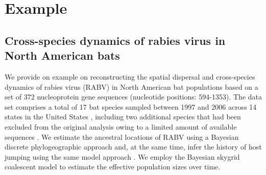 \documentclass{bioinfo}
\begin{document}
\section*{Example}

\subsection*{Cross-species dynamics of rabies virus in North American bats}

We provide on example on reconstructing the spatial dispersal and cross-species dynamics of rabies virus (RABV) in North American bat populations based on a set of 372 nucleoprotein gene sequences (nucleotide positions: 594-1353).
The data set comprises a total of 17 bat species sampled between 1997 and 2006 across 14 states in the United States \citep{Streicker}, including two additional species that had been excluded from the original analysis owing to a limited amount of available sequences \citep{Faria2013}.
We estimate the ancestral locations of RABV using a Bayesian discrete phylogeographic approach and, at the same time, infer the history of host jumping using the same model approach \citep{Lemey2009}.
We employ the Bayesian skygrid coalescent model \citep{gill2012improving} to estimate the effective population sizes over time.
\end{document}
